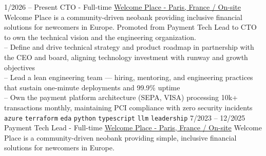 \vspace{0.2cm}


\begin{entrylist}
    \entry
    {1/2026 -- Present}
    {CTO - Full-time}
    {
        \href{https://www.linkedin.com/company/welcome-place/}{Welcome Place - Paris, France / On-site}}
    {
        Welcome Place is a community-driven neobank providing inclusive financial solutions for newcomers in Europe. Promoted from Payment Tech Lead to CTO to own the technical vision and the engineering organization. \\

        -- Define and drive technical strategy and product roadmap in partnership with the CEO and board, aligning technology investment with runway and growth objectives \\
        -- Lead a lean engineering team — hiring, mentoring, and engineering practices that sustain one-minute deployments and 99.9\% uptime \\
        -- Own the payment platform architecture (SEPA, VISA) processing 10k+ transactions monthly, maintaining PCI compliance with zero security incidents \\
        \texttt{azure}\slashsep
        \texttt{terraform}\slashsep
        \texttt{eda}\slashsep
        \texttt{python}\slashsep
        \texttt{typescript}\slashsep
        \texttt{llm}\slashsep
        \texttt{leadership}\slashsep
    }
    \entry
    {7/2023 -- 12/2025}
    {Payment Tech Lead - Full-time}
    {
        \href{https://www.linkedin.com/company/welcome-place/}{Welcome Place - Paris, France / On-site}}
    {
        Welcome Place is a community-driven neobank providing simple, inclusive financial solutions for newcomers in Europe. \\

}
\end{entrylist}
